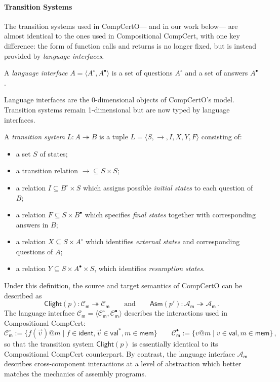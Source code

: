 \documentclass[acmsmall,screen,review,anonymous]{acmart}
\newcommand{\kw}[1]{\ensuremath{ \mathsf{#1} }}
\newcommand{\que}{\circ}
\newcommand{\ans}{\bullet}
\begin{document}
\paragraph{Transition Systems} %

The transition systems used in CompCertO---%
and in our work below---%
are almost identical to the ones used in Compositional CompCert,
with one key difference:
the form of function calls and returns is no longer fixed,
but is instead provided by \emph{language interfaces}.

\begin{definition} \label{def:li} %
A \emph{language interface} $A = \langle A^\que, A^\ans \rangle$
is a set of questions $A^\que$ and a set of answers $A^\ans$.
\end{definition}

Language interfaces are the 0-dimensional objects of CompCertO's model.
Transition systems remain 1-dimensional but are now typed
by language interfaces.

\begin{definition} \label{def:lts} %
A \emph{transition system} $L : A \twoheadrightarrow B$
is a tuple $L = \langle S, {\rightarrow}, I, X, Y, F \rangle$
consisting of:
\begin{itemize}
  \item a set $S$ of states;
  \item a transition relation ${\rightarrow} \subseteq S \times S$;
  \item a relation $I \subseteq B^\que \times S$
    which assigns possible \emph{initial states}
    to each question of $B$;
  \item a relation $F \subseteq S \times B^\ans$
    which specifies \emph{final states} together with
    corresponding answers in $B$;
  \item a relation $X \subseteq S \times A^\que$
    which identifies \emph{external states} and
    corresponding questions of $A$;
  \item a relation $Y \subseteq S \times A^\ans \times S$,
    which identifies \emph{resumption states}.
\end{itemize}
\end{definition}

Under this definition,
the source and target semantics of CompCertO can be described as
\[
  \kw{Clight}(p) : \mathcal{C}_\kw{m} \twoheadrightarrow \mathcal{C}_\kw{m}
  \qquad \text{and} \qquad
  \kw{Asm}(p') : \mathcal{A}_\kw{m} \twoheadrightarrow \mathcal{A}_\kw{m} \,.
\]
The language interface
$\mathcal{C}_\kw{m} = \langle \mathcal{C}_\kw{m}^\que, \mathcal{C}_\kw{m}^\ans \rangle$
describes the interactions used in Compositional CompCert:
\[
  \mathcal{C}_\kw{m}^\que :=
    \{ f(\vec{v})@m \mid f \in \kw{ident}, \vec{v} \in \kw{val}^*, m \in \kw{mem} \}
  \qquad
  \mathcal{C}_\kw{m}^\ans :=
    \{ v@m \mid v \in \kw{val}, m \in \kw{mem} \}
  \,,
\]
so that the transition system $\kw{Clight}(p)$ is essentially identical
to its Compositional CompCert counterpart.
By contrast, the language interface
$\mathcal{A}_\kw{m}$
describes cross-component interactions at a level of abstraction
which better matches the mechanics of assembly programs.
\end{document}
